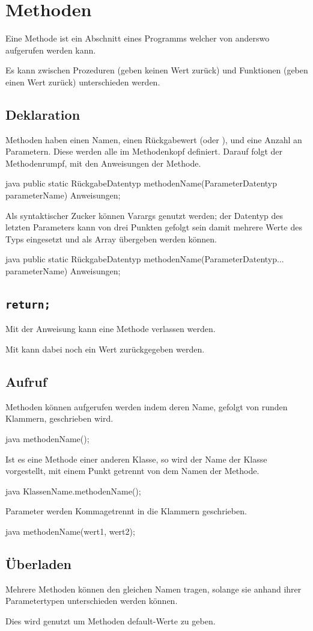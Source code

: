 \documentclass{article}
\begin{document}
\section{Methoden} 
Eine Methode ist ein Abschnitt eines Programms welcher von anderswo aufgerufen werden kann.

Es kann zwischen Prozeduren (geben keinen Wert zurück) und Funktionen (geben einen Wert zurück) unterschieden werden.

\subsection{Deklaration}
Methoden haben einen Namen, einen Rückgabewert (oder ), und eine Anzahl an Parametern. Diese werden alle im Methodenkopf definiert. Darauf folgt der Methodenrumpf, mit den Anweisungen der Methode.
\begin{sourcecode}{java}
public static RückgabeDatentyp methodenName(ParameterDatentyp parameterName) {
    Anweisungen;
}
\end{sourcecode}
Als syntaktischer Zucker können Varargs genutzt werden; der Datentyp des letzten Parameters kann von drei Punkten gefolgt sein damit mehrere Werte des Typs eingesetzt und als Array übergeben werden können.
\begin{sourcecode}{java}
public static RückgabeDatentyp methodenName(ParameterDatentyp... parameterName) {
    Anweisungen;
}
\end{sourcecode}

\subsection{\texttt{return;}}
Mit der  Anweisung kann eine Methode verlassen werden.

Mit  kann dabei noch ein Wert zurückgegeben werden.

\subsection{Aufruf}
Methoden können aufgerufen werden indem deren Name, gefolgt von runden Klammern, geschrieben wird.
\begin{slsourcecode}{java}
methodenName();
\end{slsourcecode}
Ist es eine Methode einer anderen Klasse, so wird der Name der Klasse vorgestellt, mit einem Punkt getrennt von dem Namen der Methode.
\begin{slsourcecode}{java}
KlassenName.methodenName();
\end{slsourcecode}
Parameter werden Kommagetrennt in die Klammern geschrieben.
\begin{slsourcecode}{java}
methodenName(wert1, wert2);
\end{slsourcecode}

\subsection{Überladen}
Mehrere Methoden können den gleichen Namen tragen, solange sie anhand ihrer Parametertypen unterschieden werden können.

Dies wird \idr genutzt um Methoden default-Werte zu geben.
\end{document}
